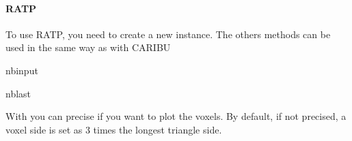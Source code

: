 \documentclass[letterpaper,10pt,english]{sphinxmanual}
\begin{document}
\paragraph{RATP}
\label{\detokenize{tool_basics:RATP}}
\sphinxAtStartPar
To use RATP, you need to create a new instance. The others methods can be used in the same way as with CARIBU

\begin{sphinxuseclass}{nbinput}
\begin{sphinxuseclass}{nblast}
{
\begin{sphinxVerbatim}[commandchars=\\\{\}]
\llap{\color{nbsphinxin}[9]:\,\hspace{\fboxrule}\hspace{\fboxsep}}
  

\end{sphinxVerbatim}
}

\end{sphinxuseclass}
\end{sphinxuseclass}
\sphinxAtStartPar
With  you can precise if you want to plot the voxels. By default, if not precised, a voxel side is set as 3 times the longest triangle side.
\end{document}
